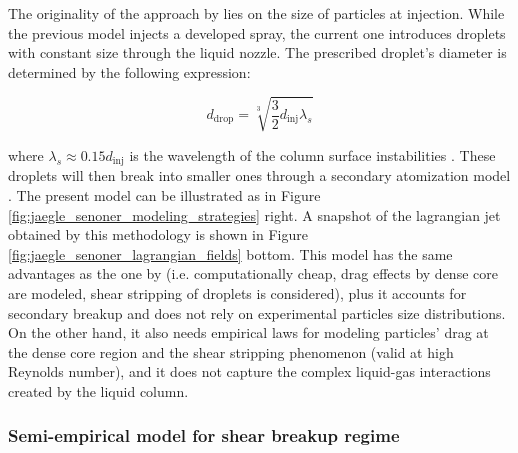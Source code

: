 The originality of the approach by  lies on the size of particles at injection. While the previous model injects a developed spray, the current one introduces droplets with constant size through the liquid nozzle. The prescribed droplet's diameter is determined by the following expression: %

\begin{equation}
\label{eq:ch5_senoner_model_ddrop}
d_\mathrm{drop} = \sqrt[3]{\frac{3}{2} d_\mathrm{inj} \lambda_s}
\end{equation}

where $\lambda_s \approx 0.15 d_\mathrm{inj}$ is the wavelength of the column surface instabilities . These droplets will then break into smaller ones through a secondary atomization model . The present model can be illustrated as in Figure \ref{fig:jaegle_senoner_modeling_strategies} right. A snapshot of the lagrangian jet obtained by this methodology is shown in Figure \ref{fig:jaegle_senoner_lagrangian_fields} bottom. This model has the same advantages as the one by  (i.e. computationally cheap, drag effects by dense core are modeled, shear stripping of droplets is considered), plus it accounts for secondary breakup and does not rely on experimental particles size distributions. On the other hand, it also needs empirical laws for modeling particles' drag at the dense core region and the shear stripping phenomenon (valid at high Reynolds number), and it does not capture the complex liquid-gas interactions created by the liquid column.




\subsubsection*{Semi-empirical model for shear breakup regime }

